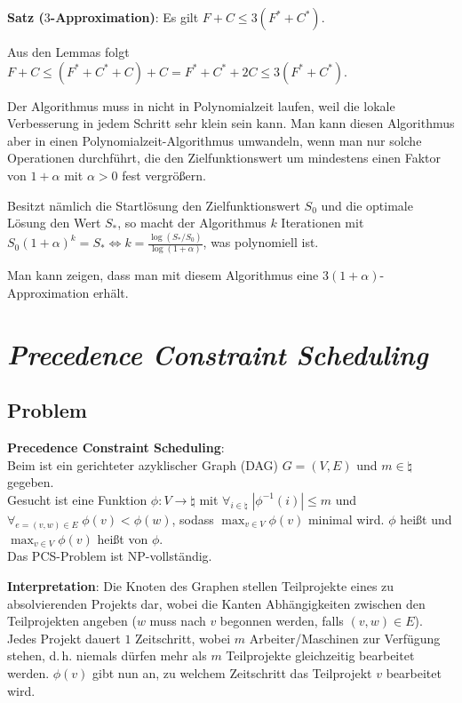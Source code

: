 \textbf{Satz ($3$-Approximation)}:
Es gilt $F + C \le 3(F^\ast + C^\ast)$.

\begin{Beweis}
    Aus den Lemmas folgt
    $F + C
    \le (F^\ast + C^\ast + C) + C
    = F^\ast + C^\ast + 2C
    \le 3(F^\ast + C^\ast)$.
\end{Beweis}

\linie

Der Algorithmus muss in nicht in Polynomialzeit laufen, weil die lokale
Verbesserung in jedem Schritt sehr klein sein kann.
Man kann diesen Algorithmus aber in einen Polynomialzeit-Algorithmus umwandeln,
wenn man nur solche Operationen durchführt,
die den Zielfunktionswert um mindestens einen Faktor von $1 + \alpha$ mit $\alpha > 0$
fest vergrößern.

Besitzt nämlich die Startlösung den Zielfunktionswert $S_0$ und die optimale Lösung den Wert
$S_\ast$,
so macht der Algorithmus $k$ Iterationen mit
$S_0 (1+\alpha)^k = S_\ast \iff k = \frac{\log(S_\ast/S_0)}{\log(1 + \alpha)}$,
was polynomiell ist.

Man kann zeigen, dass man mit diesem Algorithmus eine $3(1 + \alpha)$-Approximation erhält.

\pagebreak

\section{%
    \emph{Precedence Constraint Scheduling}%
}

\subsection{%
    Problem%
}

\textbf{Precedence Constraint Scheduling}:\\
Beim  ist
ein gerichteter azyklischer Graph (DAG) $G = (V, E)$ und $m \in \natural$ gegeben.\\
Gesucht ist eine Funktion $\phi\colon V \to \natural$ mit
$\forall_{i \in \natural}\; |\phi^{-1}(i)| \le m$ und
$\forall_{e = (v,w) \in E}\; \phi(v) < \phi(w)$, sodass $\max_{v \in V} \phi(v)$ minimal wird.
$\phi$ heißt  und $\max_{v \in V} \phi(v)$ heißt  von $\phi$.\\
Das PCS-Problem ist NP-vollständig.

\textbf{Interpretation}:
Die Knoten des Graphen stellen Teilprojekte eines zu absolvierenden Projekts dar,
wobei die Kanten Abhängigkeiten zwischen den Teilprojekten angeben
($w$ muss nach $v$ begonnen werden, falls $(v, w) \in E$).
Jedes Projekt dauert $1$ Zeitschritt,
wobei $m$ Arbeiter/Maschinen zur Verfügung stehen,
d.\,h. niemals dürfen mehr als $m$ Teilprojekte gleichzeitig bearbeitet werden.
$\phi(v)$ gibt nun an, zu welchem Zeitschritt das Teilprojekt $v$ bearbeitet wird.

